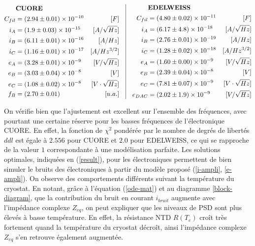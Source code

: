 \begin{align}
\label{result}
\begin{aligned}[c]
& \textrm{\textbf{CUORE}} \\
C_{fil} &= (2.94 \pm 0.01)\times 10^{-10}&[F] \\
i_A &= (1.9 \pm 0.03) \times 10^{-15}&[A/\sqrt{Hz}] \\
i_B &= (6.11 \pm 0.01) \times 10^{-16}&[A/Hz] \\
i_C &= (1.16 \pm 0.01) \times 10^{-17}&[A/Hz^{3/2}] \\
e_A &= (3.28 \pm 0.01) \times 10^{-9} &[V/\sqrt{Hz}] \\
e_B &= (3.03 \pm 0.04) \times 10^{-8}&[V] \\
e_C &= (1.08 \pm 0.02) \times 10^{-8} &[V \cdot \sqrt{Hz}] \\
f_B &= (2.70 \pm 0.01) & [u.a.]
\end{aligned}
\quad \vrule{} \quad
\begin{aligned}[c]
& \textrm{\textbf{EDELWEISS}} \\
C_{fil} &= (4.80 \pm 0.02)\times 10^{-11}&[F] \\
i_A &= (6.17 \pm 4.8) \times 10^{-18}&[A/\sqrt{Hz}] \\
i_B &= (2.76 \pm 0.01) \times 10^{-19}&[A/Hz] \\
i_C &= (1.28 \pm 0.02) \times 10^{-18}&[A/Hz^{3/2}] \\
e_A &= (1.60 \pm 0.00) \times 10^{-9} &[V/\sqrt{Hz}] \\
e_B &= (2.39 \pm 0.04) \times 10^{-8}&[V] \\
e_C &= (7.81 \pm 0.07) \times 10^{-9} &[V \cdot \sqrt{Hz}] \\
e_{DAC} &= (2.02 \pm 1.9) \times 10^{-9}&[V/\sqrt{Hz}] 
\end{aligned}
\end{align}

On vérifie bien que l'ajustement est excellent sur l'ensemble des fréquences, avec pourtant une certaine réserve pour les basses fréquences de l'électronique CUORE. En effet, la fonction de $\chi^2$ pondérée par le nombre de degrés de libertés $ddl$ est égale à $2.556$ pour CUORE et $2.0$ pour EDELWEISS, ce qui se rapproche de la valeur $1$ correspondante à une modélisation parfaite. Les solutions optimales, indiquées en (\ref{result}), pour les électroniques permettent de bien simuler le bruits des électroniques à partir du modèle proposé (\ref{i-ampli}, \ref{e-ampli}). On observe des comportements différents suivant la température du cryostat.  En notant, grâce à l'équation (\ref{ode-mat}) et au diagramme \ref{block-diagram}, que la contribution du bruit en courant $i_{bruit}$ augmente avec l'impédance complexe $Z_{eq}$, on peut expliquer que les niveaux de PSD sont plus élevés à basse température. En effet, la résistance NTD $R(T_e)$ croît très fortement quand la température du cryostat décroît, ainsi l'impédance complexe $Z_{eq}$ s'en retrouve également augmentée.

